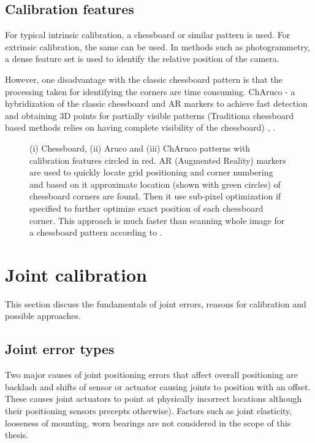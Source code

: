 \documentclass[english, printversion, nomenclature, notitle]{tuvisionthesis} %
\begin{document}
\subsection{Calibration features}

For typical intrinsic calibration, a chessboard or similar pattern is used. For extrinsic calibration, the same can be used. In methods such as photogrammetry, a dense feature set is used to identify the relative position of the camera. 

However, one disadvantage with the classic chessboard pattern is that the processing taken for identifying the corners are time consuming. ChAruco - a hybridization of the classic chessboard and AR markers to achieve fast detection and obtaining 3D points for partially visible patterns (Traditiona chessboard based methods relies on having complete visibility of the chessboard) \cite{garrido-jurado_generation_2016}, \cite{romero-ramirez_speeded_2018}.

\begin{center}
\begin{figure}
	\def\svgwidth{\linewidth}
	
	\caption{(i) Chessboard, (ii) Aruco and (iii) ChAruco patterns with calibration features circled in red. AR (Augmented Reality) markers are used to quickly locate grid positioning and corner numbering and based on it approximate location (shown with green circles) of chessboard corners are found. Then it use sub-pixel optimization if specified to further optimize exact position of each chessboard corner. This approach is much faster than scanning whole image for a chessboard pattern according to \cite{romero-ramirez_speeded_2018}.}
	\label{fig:charuco}
\end{figure}
\end{center}

\section{Joint calibration}
This section discuss the fundamentals of joint errors, reasons for calibration and possible approaches.

\subsection{Joint error types}

Two major causes of joint positioning errors that affect overall positioning are backlash and shifts of sensor or actuator causing joints to position with an offset. These causes joint actuators to point at physically incorrect locations although their positioning sensors precepts otherwise). Factors such as joint elasticity, looseness of mounting, worn bearings are not considered in the scope of this thesis.
\end{document}
